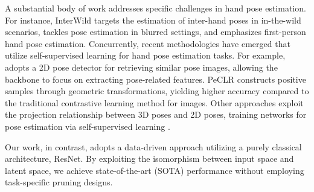 A substantial body of work addresses specific challenges in hand pose estimation. For instance, InterWild\cite{moon_bringing_2023} targets the estimation of inter-hand poses in in-the-wild scenarios, \cite{blur_oh2023recovering3dhandmesh} tackles pose estimation in blurred settings, and \cite{ego_Prakash2024Hands} emphasizes first-person hand pose estimation. Concurrently, recent methodologies have emerged that utilize self-supervised learning for hand pose estimation tasks. For example, \cite{lin_pre-training_2024} adopts a 2D pose detector for retrieving similar pose images, allowing the backbone to focus on extracting pose-related features. PeCLR\cite{spurr_peclr_2022} constructs positive samples through geometric transformations, yielding higher accuracy compared to the traditional contrastive learning method for images\cite{chen_simclr_2020}. Other approaches exploit the projection relationship between 3D poses and 2D poses, training networks for pose estimation via self-supervised learning \cite{10.1109/TPAMI.2023.3247907,epipolartransformers,zheng2023hamuco,spurr_peclr_2022}.

Our work, in contrast, adopts a data-driven approach utilizing a purely classical architecture, ResNet\cite{He_2016_CVPR}. By exploiting the isomorphism between input space and latent space, we achieve state-of-the-art (SOTA) performance without employing task-specific pruning designs.

